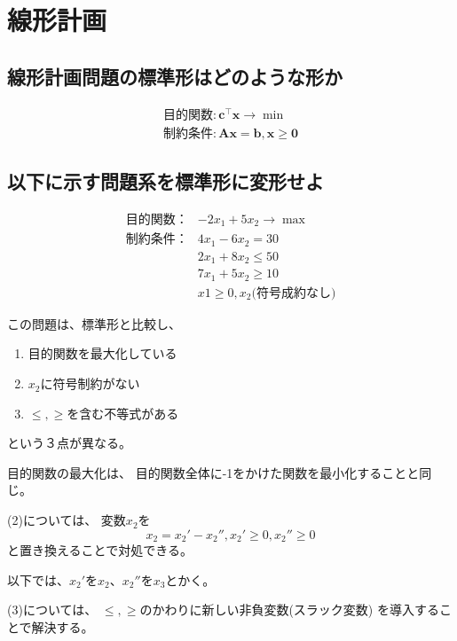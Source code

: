 \documentclass[9pt]{ltjsreport}
\begin{document}
\section{線形計画}
\subsection{線形計画問題の標準形はどのような形か}
\begin{tcolorbox}[title=線形計画問題の標準形]
    \begin{gather*}
        \text{目的関数}:\bm{c}^\top \bm{x}
        \longrightarrow \min\\        
        \text{制約条件}:\bm{Ax}=\bm{b},\bm{x} \ge \bm{0}
    \end{gather*}
\end{tcolorbox}
\subsection{以下に示す問題系を標準形に変形せよ}

\begin{align*}
    \text{目的関数：}&-2x_1+5x_2\longrightarrow\max\\
    \text{制約条件：}&4x_1-6x_2=30\\
    &2x_1+8x_2\le50\\
    &7x_1+5x_2\ge10\\
    &x1\ge0,x_2\text{(符号成約なし)}
\end{align*}

\hrulefill

この問題は、標準形と比較し、
\begin{enumerate}
    \item 目的関数を最大化している
    \item $x_2$に符号制約がない
    \item $\le,\ge$を含む不等式がある
\end{enumerate}
という３点が異なる。

目的関数の最大化は、
目的関数全体に-1をかけた関数を最小化することと同じ。

(2)については、
変数$x_2$を
\begin{equation*}
    x_2=x_2'-x_2'', x_2'\ge0,x_2''\ge0
\end{equation*}
と置き換えることで対処できる。

以下では、$x_2'$を$x_2$、$x_2''$を$x_3$とかく。

(3)については、
$\le , \ge$のかわりに新しい非負変数(スラック変数)
を導入することで解決する。
\end{document}

